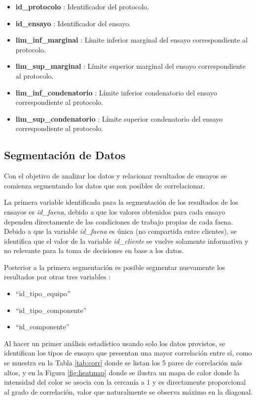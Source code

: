 \documentclass{article}
\begin{document}
\begin{itemize}
	\item \textbf{id\_protocolo} : Identificador del protocolo.
	\item \textbf{id\_ensayo} : Identificador del ensayo.
	\item \textbf{lim\_inf\_marginal} : Límite inferior marginal del ensayo correspondiente al protocolo.
	\item \textbf{lim\_sup\_marginal} : Límite superior marginal del ensayo correspondiente al protocolo.
	\item \textbf{lim\_inf\_condenatorio} : Límite inferior condenatorio del ensayo correspondiente al protocolo.
	\item \textbf{lim\_sup\_condenatorio} : Límite superior condenatorio del ensayo correspondiente al protocolo.
\end{itemize}

\subsection{Segmentación de Datos}

Con el objetivo de analizar los datos y relacionar resultados de ensayos se comienza segmentando los datos que son posibles de correlacionar.

La primera variable identificada para la segmentación de los resultados de los ensayos es \textit{id\_faena}, debido a que los valores obtenidos para cada ensayo dependen directamente de las condiciones de trabajo propias de cada faena. Debido a que la variable \textit{id\_faena} es única (no compartida entre clientes), se identifica que el valor de la variable \textit{id\_cliente} se vuelve solamente informativa y no relevante para la toma de decisiones en base a los datos.

Posterior a la primera segmentación es posible segmentar nuevamente los resultados por otras tres variables :

\begin{itemize}
	\item ``id\_tipo\_equipo''
	\item ``id\_tipo\_componente''
	\item ``id\_componente''
\end{itemize}

Al hacer un primer an\'alisis estad\'istico usando solo los datos provistos, se identifican los tipos de ensayo que presentan una mayor correlaci\'on entre s\'i, como se muestra en la Tabla \ref{tab:corr} donde se listan los 5 pares de correlaci\'on m\'as altos, y en la Figura \ref{fig:heatmap} donde se ilustra un mapa de calor donde la intensidad del color se asocia con la cercan\'ia a 1 y es directamente proporcional al grado de correlaci\'on, valor que naturalmente se observa m\'aximo en la diagonal.
\end{document}
